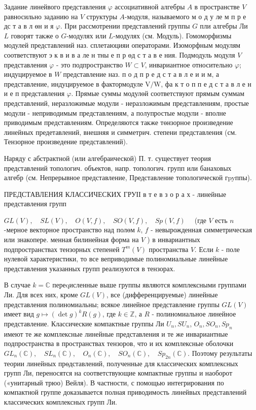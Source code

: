 \documentclass[10pt]{article}
\begin{document}
Задание линейвого представления $\varphi$ ассоциативной алгебры $A$ в пространстве $V$ равносильно заданию на $V$ структуры $A$-модуля, называемого м о д у ле м п р е дс т а в л өн и я $\varphi$. При рассмотрении представлений группы $G$ пли алгебры Ли $L$ говорят также о $G$-модулях или $L$-модулях (см. Модуль). Гомоморфизмы модулей представлений наз. сплетаюцияи операторами. Изоморфным модулям соответствуют э к в и в а ле н тны е п р өд с т а в е ния. Подмодуль модуля $V$ представления $\varphi$ - это подпространство $W \subset V$, инвариантное относительно $\varphi$; индуцируемое в $W$ представление наз. п о д п р е д с т а в л е и и м, а представление, индуцируемое в фактормодуле $\mathrm{V} / \mathrm{W}$, фа к т о п п е д с т а в л е н и е п представления $\varphi$. Прямые суммы модулөй соответствуют прямым суммам представлений, неразложимые модули - неразложимым представлениям, простые модули - неприводимым представлениям, а полупростые модули - вполне приводимым представлениям. Определяются также төнзорное произведение линейных предетавлений, внешняя и симметрич. степени представления (см. Тензорное произведение представлений).



Наряду с абстрактной (или алгебраической) П. т. существует теория представлений топологич. объектов, напр. топологич. групп или банаховых алгебр (см. Непрерывное представление, Представление топологической гpyппы).



ПРЕДСТАВЛЕНИЯ КЛАССИЧЕСКИХ ГРУІІ в т е в з о р а х - линейные представления групп

$G L(V), \quad S L(V), \quad O(V, f), \quad S O(V, f), \quad S p(V, f) \quad$ (где $V$ есть $n$-мерное векторное пространство над полөм $k$, $f$ - невырожденная симметрическая или знакопере. менная билинейная форма на $V$ ) в инвариантных подпространствах тензорных степеней $T^{m}(V)$ пространства $V$. Если $k$ - поле нулевой характеристики, то все веприводимые полиномиальные линейные представления указанных групп реализуются в тензорах.



В случае $k=\mathbb{C}$ переqисленные выше группы являются комплексными группами Ли. Для всех них, кроме $G L(V)$, все (дифференцируемые) линейные представления полиномиальны; всякое линейное представление группы $G L(V)$ имеет вид $g \mapsto(\operatorname{det} g)^{k} R(g)$, где $k \in \mathbb{Z}$, а $R$ - полиномиальное линейное представление. Классические компактные группы Ли $U_{n}, S U_{n}$, $O_{n}, S O_{n}, S p_{n}$ имеют те же комплексные линейные представления и те же инвариантные подпространства в пространствах тензоров, что и их комплексные оболочки $G L_{n}(\mathbb{C}), \quad S L_{n}(\mathbb{C}), \quad O_{n}(\mathbb{C}), \quad S O_{n}(\mathbb{C}), \quad S p_{2 n}(\mathbb{C})$. Поэтому результаты теории линейных прөдставлений, полученные для классических комплексных групп Ли, переносятся на соответствующие компактные группы и наоборот («унитарный трюо) Вейля). В частности, с помощью интегрирования по компактной группе доказывается полная приводимость линейвых представлений классических комплексных групп Ли.
\end{document}
